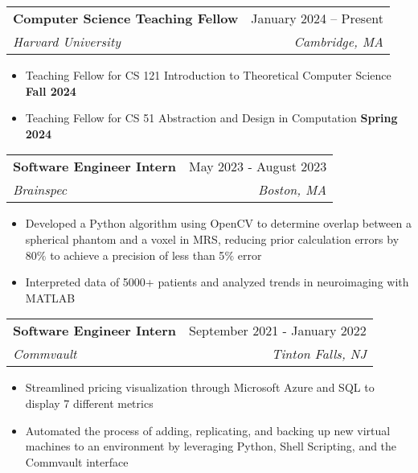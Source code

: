 \documentclass[letterpaper,11pt]{article}
\makeatletter
\newcommand{\resumeItem}[1]{
  \item\small{
    {#1 \vspace{-2pt}}
  }
}
\newcommand{\resumeSubheading}[4]{
  \vspace{-2pt}\item
    \begin{tabular*}{0.97\textwidth}[t]{l@{\extracolsep{\fill}}r}
      \textbf{#1} & #2 \\
      \textit{\small#3} & \textit{\small #4} \\
    \end{tabular*}\vspace{-7pt}
}
\newcommand{\resumeSubSubheading}[2]{
    \item
    \begin{tabular*}{0.97\textwidth}{l@{\extracolsep{\fill}}r}
      \textit{\small#1} & \textit{\small #2} \\
    \end{tabular*}\vspace{-7pt}
}
\newcommand{\resumeSubHeadingListEnd}{\end{itemize}}
\newcommand{\resumeItemListStart}{\begin{itemize}}
\newcommand{\resumeItemListEnd}{\end{itemize}\vspace{-5pt}}
\makeatother
\begin{document}
    \resumeSubheading
      {Computer Science Teaching Fellow}{January 2024 -- Present}
      {Harvard University}{Cambridge, MA}
      \resumeItemListStart
        \resumeItem{Teaching Fellow for CS 121 Introduction to Theoretical Computer Science \textbf{Fall 2024}}
        \resumeItem{Teaching Fellow for CS 51 Abstraction and Design in Computation \textbf{Spring 2024}}
      \resumeItemListEnd
      



    \resumeSubheading
      {Software Engineer Intern}{May 2023 - August 2023}
      {Brainspec}{Boston, MA}
      \resumeItemListStart
        \resumeItem{Developed a Python algorithm using OpenCV to determine overlap between a spherical phantom and a voxel in MRS, reducing prior calculation errors by 80$\%$ to achieve a precision of less than 5$\%$ error}
        \resumeItem{Interpreted data of 5000+ patients and analyzed trends in neuroimaging with MATLAB}
      \resumeItemListEnd

      \resumeSubheading
      {Software Engineer Intern}{September 2021 - January 2022}
      {Commvault}{Tinton Falls, NJ}
      \resumeItemListStart
        \resumeItem{Streamlined pricing visualization through Microsoft Azure and SQL to display 7 different metrics}
        \resumeItem{Automated the process of adding, replicating, and backing up new virtual machines to an environment by leveraging Python, Shell Scripting, and the Commvault interface}
      \resumeItemListEnd
\end{document}
